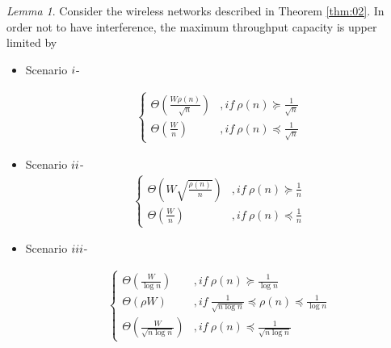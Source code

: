 \documentclass[journal]{IEEEtran}
\theoremstyle{plain}
\theoremstyle{remark}
\newtheorem{lemma}{Lemma}
\begin{document}
\begin{lemma}\label{lem:03}
	Consider the wireless networks described in Theorem \ref{thm:02}. In order not to have interference, the maximum throughput capacity is upper limited by  
	
	\begin{itemize}
		\item Scenario $\romannumeral 1$- 
		
		\begin{eqnarray}
			\left\{\begin{array}{ll}
					\Theta(\frac{W\rho(n)}{\sqrt{n}})& ,if\ \rho(n)\succeq \frac{1}{\sqrt{n}} \\
					\Theta(\frac{W}{n})& ,if\ \rho(n)\preceq \frac{1}{\sqrt{n}} \nonumber
		\end{array}\right .
		\end{eqnarray}
		
		\item Scenario $\romannumeral 2$- 
		\begin{eqnarray}
			\left\{\begin{array}{ll}
					\Theta(W\sqrt{\frac{\rho(n)}{n}})& ,if\ \rho(n)\succeq \frac{1}{n} \\
					\Theta(\frac{W}{n})& ,if\ \rho(n)\preceq \frac{1}{n} \nonumber
		\end{array}\right .
		\end{eqnarray}	
		
		\item Scenario $\romannumeral 3$-	
		
		\begin{eqnarray}
			\left\{\begin{array}{ll}
					\Theta(\frac{W}{\log n})& ,if\ \rho(n)\succeq \frac{1}{\log n} \\
					\Theta(\rho W)& ,if\ \frac{1}{\sqrt{n\log n}} \preceq \rho(n) \preceq \frac{1}{\log n} \\
					\Theta(\frac{W}{\sqrt{n \log n}})& ,if\ \rho(n)\preceq \frac{1}{\sqrt{n\log n}} \nonumber
		\end{array}\right .
		\end{eqnarray}
		\end{itemize}
\end{lemma}	
		
\end{document}
